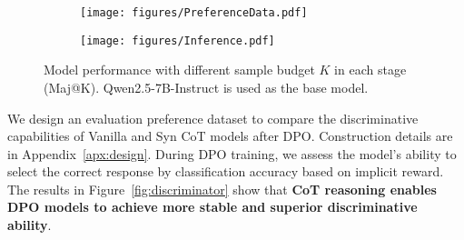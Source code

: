 \begin{figure}[t]
  \centering
  \begin{subfigure}[t]{0.493\linewidth}
    \centering
    \texttt{[image: figures/PreferenceData.pdf]}
    \label{fig:scaleMaj-b}
  \end{subfigure}
  \hfill
  \begin{subfigure}[t]{0.493\linewidth}
    \centering
    \texttt{[image: figures/Inference.pdf]}
    \label{fig:scaleMaj-c}
  \end{subfigure}
  \caption{Model performance with different sample budget $K$ in each stage (Maj@K). Qwen2.5-7B-Instruct is used as the base model.}
  \label{fig:scaleMaj}
\end{figure}


We design an evaluation preference dataset to compare the discriminative capabilities of Vanilla and Syn CoT models after DPO. Construction details are in Appendix~\ref{apx:design}. During DPO training, we assess the model's ability to select the correct response by classification accuracy based on implicit reward. The results in Figure~\ref{fig:discriminator} show that \textbf{CoT reasoning enables DPO models to achieve more stable and superior discriminative ability}.


